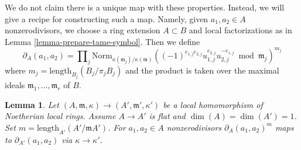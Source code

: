 \documentclass[10pt,a4paper]{amsart}
\theoremstyle{plain}
\newtheorem{lemma}[subsection]{Lemma}
\theoremstyle{definition}
\theoremstyle{remark}
\numberwithin{equation}{subsection}
\begin{document}
\medskip\noindent
We do not claim there is a unique map with these properties.
Instead, we will give a recipe for constructing such a map.
Namely, given $a_1, a_2 \in A$ nonzerodivisors, we choose
a ring extension $A \subset B$ and local factorizations
as in Lemma \ref{lemma-prepare-tame-symbol}.
Then we define
\begin{equation}
\label{equation-tame-symbol}
\partial_A(a_1, a_2) = \prod\nolimits_j
\text{Norm}_{\kappa(\mathfrak m_j)/\kappa(\mathfrak m)}
((-1)^{e_{1, j}e_{2, j}}u_{1, j}^{e_{2, j}}u_{2, j}^{-e_{1, j}}
\bmod \mathfrak m_j)^{m_j}
\end{equation}
where $m_j = \text{length}_{B_j}(B_j/\pi_j B_j)$ and the product
is taken over the maximal ideals $\mathfrak m_1, \ldots, \mathfrak m_r$ of $B$.

\begin{lemma}
\label{lemma-tame-symbol-formally-smooth}
Let $(A, \mathfrak m, \kappa) \to (A', \mathfrak m', \kappa')$
be a local homomorphism of Noetherian local rings. Assume $A \to A'$
is flat and $\dim(A) = \dim(A') = 1$. Set
$m = \text{length}_{A'}(A'/\mathfrak mA')$.
For $a_1, a_2 \in A$ nonzerodivisors
$\partial_A(a_1, a_2)^m$ maps to $\partial_{A'}(a_1, a_2)$
via $\kappa \to \kappa'$.
\end{lemma}
\end{document}
